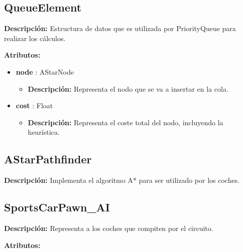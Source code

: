 \subsection{QueueElement}
\textbf{Descripción: }Estructura de datos que es utilizada por PriorityQueue para realizar los cálculos.

\bigskip

\textbf{Atributos: }
\begin{itemize}
    \item \textbf{node} : AStarNode
    \begin{itemize}
        \item \textbf{Descripción: }Representa el nodo que se va a insertar en la cola.
    \end{itemize}

    \item \textbf{cost} : Float
    \begin{itemize}
        \item \textbf{Descripción: }Representa el coste total del nodo, incluyendo la heurística.
    \end{itemize}
\end{itemize}
\subsection{AStarPathfinder}
\textbf{Descripción: }Implementa el algoritmo A* para ser utilizado por los coches.


\subsection{SportsCarPawn\_AI}
\textbf{Descripción: }Representa a los coches que compiten por el circuito.

\bigskip

\textbf{Atributos: }

